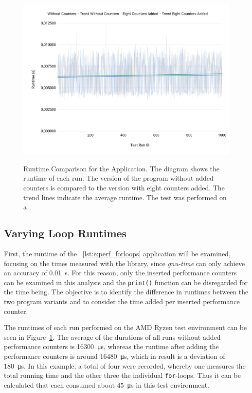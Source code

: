 \begin{figure}[t]
  \centering
    \caption[Runtime Comparison for the \VARYINGLOOP Application.]{Runtime Comparison for the \VARYINGLOOP Application. The diagram shows the runtime of each run.  The version of the program without added counters is compared to the version with eight counters added. The trend lines indicate the average runtime. The test was performed on a \AMD.} 
  \includegraphics[width=1\textwidth]{graphics/e_forloop_comparison.png}
  \label{fig:e:forloop_comparison}
\end{figure}

\subsection{Varying Loop Runtimes}
First, the runtime of the \VARYINGLOOP~\ref{lst:e:perf_forloops} application will be examined, focusing on the times measured with the \CHRONO library, since \emph{gnu-time} can only achieve an accuracy of \SI{0.01}{\second}. For this reason, only the inserted performance counters can be examined in this analysis and the \lstinline{print()} function can be disregarded for the time being. The objective is to identify the difference in runtimes between the two program variants and to consider the time added per inserted performance counter.

The runtimes of each run performed on the AMD Ryzen test environment can be seen in Figure~\ref{fig:e:forloop_comparison}. The average of the durations of all runs without added performance counters is  \SI{16300}{\micro\second}, whereas the runtime after adding the performance counters is around \SI{16480}{\micro\second}, which in result is a deviation of \SI{180}{\micro\second}. In this example, a total of four \MEASUREPAIRS were recorded, whereby one measures the total running time and the other three the individual \lstinline{for}-loops. Thus it can be calculated that each \MEASUREPAIR consumed about \SI{45}{\micro\second} in this test environment. 


